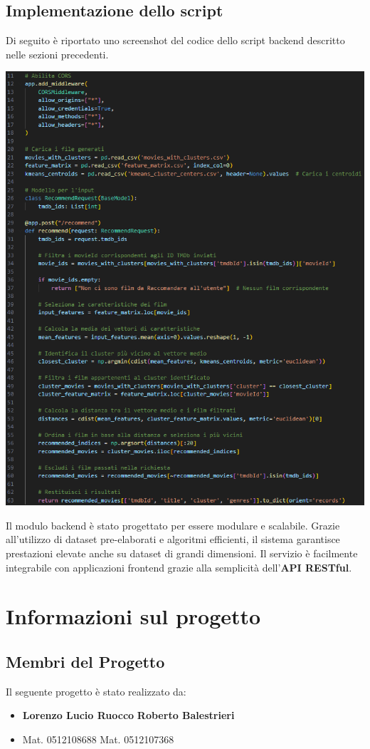 \documentclass[a4paper,12pt]{article}
\begin{document}
\subsection{Implementazione dello script}
Di seguito è riportato uno screenshot del codice dello script backend descritto nelle sezioni precedenti.
\begin{center}
    \includegraphics[]{./grafici/backend.png}
\end{center}
Il modulo backend è stato progettato per essere modulare e scalabile. Grazie all'utilizzo di dataset pre-elaborati e algoritmi efficienti, il sistema garantisce prestazioni elevate anche su dataset di grandi dimensioni. Il servizio è facilmente integrabile con applicazioni frontend grazie alla semplicità dell'\textbf{API RESTful}.
\section{Informazioni sul progetto}
	\subsection{Membri del Progetto}
	Il seguente progetto è stato realizzato da:  
\begin{itemize}
\item[] \textbf{Lorenzo Lucio Ruocco}\hspace{2cm}
            \textbf{Roberto Balestrieri}
	\vspace{-0.5cm}
\item[] Mat. 0512108688 \hspace{3.4cm}
	  Mat. 0512107368
\end{itemize}
\end{document}
